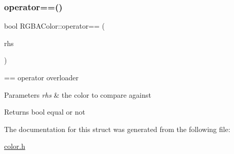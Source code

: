 \subsubsection{\texorpdfstring{operator==()}{operator==()}}
{\footnotesize\ttfamily bool R\+G\+B\+A\+Color\+::operator== (\begin{DoxyParamCaption}\item[{const \hyperlink{struct_r_g_b_a_color}{R\+G\+B\+A\+Color} \&}]{rhs }\end{DoxyParamCaption})\hspace{0.3cm}{\ttfamily [inline]}}



== operator overloader 


\begin{DoxyParams}{Parameters}
{\em rhs} & the color to compare against \\
\hline
\end{DoxyParams}
\begin{DoxyReturn}{Returns}
bool equal or not 
\end{DoxyReturn}


The documentation for this struct was generated from the following file\+:\begin{DoxyCompactItemize}
\item 
\hyperlink{color_8h}{color.\+h}\end{DoxyCompactItemize}
